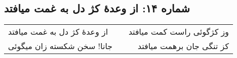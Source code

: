\begin{center}
\section*{شماره ۱۴: از وعدۀ کژ دل به غمت میافتد}
\label{sec:014}
\begin{longtable}{l p{0.5cm} r}
از وعدهٔ کژ دل به غمت میافتد
&&
وز کژگوئی راست کمت میافتد
\\
جانا! سخن شکسته زان میگوئی
&&
کز تنگی جان برهمت میافتد
\\
\end{longtable}
\end{center}

